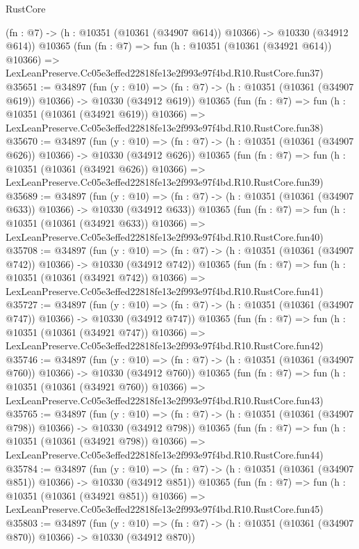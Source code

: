 \begin{lexlean}{RustCore}
\begin{coremodule}
    (fn : @7) -> (h : @10351 (@10361 (@34907 @614)) @10366) -> @10330 (@34912 @614))
    @10365
    (fun (fn : @7) =>
    fun (h : @10351 (@10361 (@34921 @614)) @10366) =>
    LexLeanPreserve.Cc05e3effed22818fe13e2f993e97f4bd.R10.RustCore.fun37)
@35651 := @34897
    (fun (y : @10) =>
    (fn : @7) -> (h : @10351 (@10361 (@34907 @619)) @10366) -> @10330 (@34912 @619))
    @10365
    (fun (fn : @7) =>
    fun (h : @10351 (@10361 (@34921 @619)) @10366) =>
    LexLeanPreserve.Cc05e3effed22818fe13e2f993e97f4bd.R10.RustCore.fun38)
@35670 := @34897
    (fun (y : @10) =>
    (fn : @7) -> (h : @10351 (@10361 (@34907 @626)) @10366) -> @10330 (@34912 @626))
    @10365
    (fun (fn : @7) =>
    fun (h : @10351 (@10361 (@34921 @626)) @10366) =>
    LexLeanPreserve.Cc05e3effed22818fe13e2f993e97f4bd.R10.RustCore.fun39)
@35689 := @34897
    (fun (y : @10) =>
    (fn : @7) -> (h : @10351 (@10361 (@34907 @633)) @10366) -> @10330 (@34912 @633))
    @10365
    (fun (fn : @7) =>
    fun (h : @10351 (@10361 (@34921 @633)) @10366) =>
    LexLeanPreserve.Cc05e3effed22818fe13e2f993e97f4bd.R10.RustCore.fun40)
@35708 := @34897
    (fun (y : @10) =>
    (fn : @7) -> (h : @10351 (@10361 (@34907 @742)) @10366) -> @10330 (@34912 @742))
    @10365
    (fun (fn : @7) =>
    fun (h : @10351 (@10361 (@34921 @742)) @10366) =>
    LexLeanPreserve.Cc05e3effed22818fe13e2f993e97f4bd.R10.RustCore.fun41)
@35727 := @34897
    (fun (y : @10) =>
    (fn : @7) -> (h : @10351 (@10361 (@34907 @747)) @10366) -> @10330 (@34912 @747))
    @10365
    (fun (fn : @7) =>
    fun (h : @10351 (@10361 (@34921 @747)) @10366) =>
    LexLeanPreserve.Cc05e3effed22818fe13e2f993e97f4bd.R10.RustCore.fun42)
@35746 := @34897
    (fun (y : @10) =>
    (fn : @7) -> (h : @10351 (@10361 (@34907 @760)) @10366) -> @10330 (@34912 @760))
    @10365
    (fun (fn : @7) =>
    fun (h : @10351 (@10361 (@34921 @760)) @10366) =>
    LexLeanPreserve.Cc05e3effed22818fe13e2f993e97f4bd.R10.RustCore.fun43)
@35765 := @34897
    (fun (y : @10) =>
    (fn : @7) -> (h : @10351 (@10361 (@34907 @798)) @10366) -> @10330 (@34912 @798))
    @10365
    (fun (fn : @7) =>
    fun (h : @10351 (@10361 (@34921 @798)) @10366) =>
    LexLeanPreserve.Cc05e3effed22818fe13e2f993e97f4bd.R10.RustCore.fun44)
@35784 := @34897
    (fun (y : @10) =>
    (fn : @7) -> (h : @10351 (@10361 (@34907 @851)) @10366) -> @10330 (@34912 @851))
    @10365
    (fun (fn : @7) =>
    fun (h : @10351 (@10361 (@34921 @851)) @10366) =>
    LexLeanPreserve.Cc05e3effed22818fe13e2f993e97f4bd.R10.RustCore.fun45)
@35803 := @34897
    (fun (y : @10) =>
    (fn : @7) -> (h : @10351 (@10361 (@34907 @870)) @10366) -> @10330 (@34912 @870))

\end{coremodule}
\end{lexlean}
